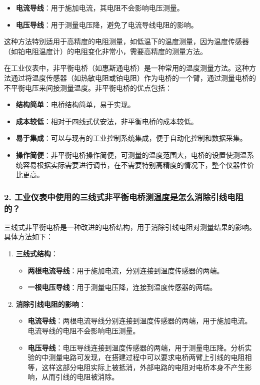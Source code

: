 \documentclass[zihao=5, UTF8]{article}
\theoremstyle{MyLineTheoremStyle} %
\theoremstyle{MyBlockTheoremStyle} %
\theoremstyle{MySubsubsectionStyle} %
\begin{document}
\begin{itemize}
    \item \textbf{电流导线}：用于施加电流，其电阻不会影响电压测量。
    \item \textbf{电压导线}：用于测量电压降，避免了电流导线电阻的影响。
\end{itemize}

这种方法特别适用于高精度的电阻测量，如低温下的温度测量，因为温度传感器（如铂电阻温度计）的电阻变化非常小，需要高精度的测量方法。

在工业仪表中，非平衡电桥（如惠斯通电桥）是一种常用的温度测量方法。这种方法通过将温度传感器（如热敏电阻或铂电阻）作为电桥的一个臂，通过测量电桥的不平衡电压来间接测量温度。非平衡电桥的优点包括：

\begin{itemize}
    \item \textbf{结构简单}：电桥结构简单，易于实现。
    \item \textbf{成本较低}：相对于四线式伏安法，非平衡电桥的成本较低。
    \item \textbf{易于集成}：可以与现有的工业控制系统集成，便于自动化控制和数据采集。
    \item \textbf{操作简便}：非平衡电桥操作简便，可测量的温度范围大，电桥的设置使测温系统容易根据实际需要进行调节，在不需要特别高精度的情况下，整个仪器性价比更高。
\end{itemize}

\subsubsection*{2. 工业仪表中使用的三线式非平衡电桥测温度是怎么消除引线电阻的？}

三线式非平衡电桥是一种改进的电桥结构，用于消除引线电阻对测量结果的影响。具体方法如下：

\begin{enumerate}
    \item \textbf{三线式结构}：
    \begin{itemize}
        \item \textbf{两根电流导线}：用于施加电流，分别连接到温度传感器的两端。
        \item \textbf{一根电压导线}：用于测量电压降，连接到温度传感器的两端。    \end{itemize}
    
    \item \textbf{消除引线电阻的影响}：
    \begin{itemize}
        \item \textbf{电流导线}：两根电流导线分别连接到温度传感器的两端，用于施加电流。电流导线的电阻不会影响电压测量。
        \item \textbf{电压导线}：电压导线连接到温度传感器的两端，用于测量电压降。分析实验的中测量电路可发现，在搭建过程中可以要求电桥两臂上引线的电阻相等，这样这部分电阻实际上被抵消，外部电路的电阻对电桥本身不产生影响，从而引线的电阻被消除。
    \end{itemize}

\end{enumerate}
\end{document}
